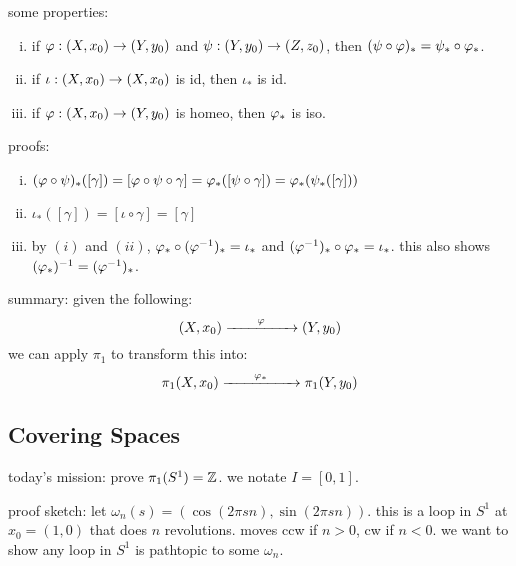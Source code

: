 some properties:
\begin{enumerate}[(i)]
    \item if $\varphi:(X,x_{0})\rightarrow(Y,y_{0})$ and $\psi:(Y,y_{0})\rightarrow(Z,z_{0})$,
        then $(\psi\circ\varphi)_{*}=\psi_{*}\circ\varphi_{*}$.
    \item if $\iota:(X,x_{0})\rightarrow(X,x_{0})$ is id, then $\iota_{*}$ is id.
    \item if $\varphi:(X,x_{0})\rightarrow(Y,y_{0})$ is homeo, then $\varphi_{*}$ is iso.
\end{enumerate}
proofs:
\begin{enumerate}[(i)]
    \item $(\varphi\circ\psi)_{*}([\gamma])=[\varphi\circ\psi\circ\gamma]
        =\varphi_{*}([\psi\circ\gamma])=\varphi_{*}(\psi_{*}([\gamma]))$
    \item $\iota_{*}([\gamma])=[\iota\circ\gamma]=[\gamma]$
    \item by $(i)$ and $(ii)$, $\varphi_{*}\circ(\varphi^{-1})_{*}=\iota_{*}$ and
        $(\varphi^{-1})_{*}\circ\varphi_{*}=\iota_{*}$.
        this also shows $(\varphi_{*})^{-1}=(\varphi^{-1})_{*}$.
\end{enumerate}

summary: given the following:
\begin{equation*}
    (X,x_{0}) \xrightarrow{\qquad \varphi \qquad} (Y,y_{0})
\end{equation*}
we can apply $\pi_{1}$ to transform this into:
\begin{equation*}
    \pi_{1}(X,x_{0}) \xrightarrow{\qquad \varphi_{*} \qquad} \pi_{1}(Y,y_{0})
\end{equation*}

\subsection{Covering Spaces}

today's mission: prove $\pi_{1}(S^{1})=\mathbb{Z}$.
we notate $I=[0,1]$.

proof sketch: let $\omega_{n}(s)=(\cos(2\pi sn),\sin(2\pi sn))$.
this is a loop in $S^{1}$ at $x_{0}=(1,0)$ that does $n$ revolutions.
moves ccw if $n>0$, cw if $n<0$.
we want to show any loop in $S^{1}$ is pathtopic to some $\omega_{n}$.

